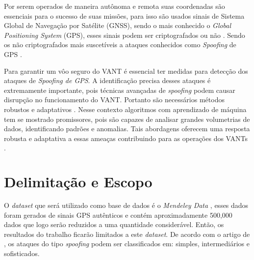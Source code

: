 \documentclass[12pt]{article}
\begin{document}
Por serem operados de maneira autônoma e remota suas coordenadas são essenciais
para o sucesso de suas missões, para isso são usados sinais de Sistema Global de Navegação por Satélite (GNSS),
sendo o mais conhecido o \textit{Global Positioning System} (GPS), esses sinais podem ser criptografados ou não
\cite {lester}. Sendo os não criptografados mais suscetíveis a ataques conhecidos como \textit{Spoofing} de GPS \cite{srinivasansGPSSpoofingDetection2023}. 



Para garantir um vôo seguro do VANT é essencial ter medidas para detecção dos ataques de \textit{Spoofing de GPS}.
A identificação precisa desses ataques é extremamente importante, pois técnicas avançadas de \textit{spoofing}
podem causar disrupção no funcionamento do VANT. Portanto são necessários métodos robustos e adaptativos \cite{isleyenGPSSpoofingDetection2024}.
Nesse contexto algoritmos com aprendizado de máquina tem se mostrado promissores, pois são capazes de analisar
grandes volumetrias de dados, identificando padrões e anomalias. Tais abordagens oferecem uma resposta robusta e adaptativa a essas ameaças contribuindo para as operações dos VANTs \cite[tradução nossa]{isleyenGPSSpoofingDetection2024}.


\section{Delimitação e Escopo}
O \textit{dataset} que será utilizado como base de dados é o \textit{Mendeley Data} 
\cite{aissou2022dataset}, esses dados foram gerados de sinais GPS autênticos e 
contém aproximadamente 500,000 dados que logo serão reduzidos a uma quantidade
considerável. Então, os resultados do trabalho ficarão
limitados a este \textit{dataset}. De acordo com o artigo de \cite{Aissou2021}, os ataques do tipo \textit{spoofing} podem ser classificados em: simples, intermediários e sofisticados.
\end{document}

